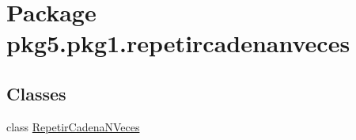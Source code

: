 \hypertarget{namespacepkg5_1_1pkg1_1_1repetircadenanveces}{}\section{Package pkg5.\+pkg1.\+repetircadenanveces}
\label{namespacepkg5_1_1pkg1_1_1repetircadenanveces}
\subsection*{Classes}
\begin{DoxyCompactItemize}
\item 
class \mbox{\hyperlink{classpkg5_1_1pkg1_1_1repetircadenanveces_1_1_repetir_cadena_n_veces}{Repetir\+Cadena\+N\+Veces}}
\end{DoxyCompactItemize}
